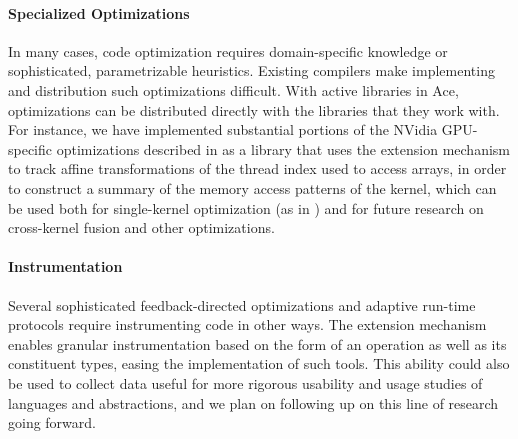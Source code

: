 \documentclass[10pt]{sigplanconf}
\begin{document}
\paragraph{Specialized Optimizations}
In many cases, code optimization requires domain-specific knowledge or sophisticated, parametrizable heuristics. Existing compilers make implementing and distribution such optimizations difficult. With active libraries in Ace, optimizations can be distributed directly with the libraries that they work with. For instance, we have implemented substantial portions of the NVidia GPU-specific optimizations described in \cite{yang2010gpgpu} as a library that uses the extension mechanism to track affine transformations of the thread index used to access arrays, in order to construct a summary of the memory access patterns of the kernel, which can be used both for single-kernel optimization (as in \cite{yang2010gpgpu}) and for future research on cross-kernel fusion and other optimizations.

\paragraph{Instrumentation}
Several sophisticated feedback-directed optimizations and adaptive run-time protocols require instrumenting code in other ways. The extension mechanism enables granular instrumentation based on the form of an operation as well as its constituent types, easing the implementation of such tools. This ability could also be used to collect data useful for more rigorous usability and usage studies of languages and abstractions, and we plan on following up on this line of research going forward.
\end{document}
